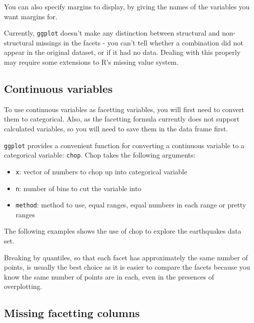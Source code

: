 You can also specify margins to display, by giving the names of the variables you want margins for.  


Currently, {\tt ggplot} doesn't make any distinction between structural and non-structural missings in the facets - you can't tell whether a combination did not appear in the original dataset, or if it had no data.  Dealing with this properly may require some extensions to R's missing value system.  

\subsection{Continuous variables}\label{sub:continuous_variables}

To use continuous variables as facetting variables, you will first need to convert them to categorical.  Also, as the facetting formula currently does not support calculated variables, so you will need to save them in the data frame first.

{\tt ggplot} provides a convenient function for converting a continuous variable to a categorical variable: {\tt chop}.  Chop takes the following arguments:

\begin{itemize}
	\item {\tt x}: vector of numbers to chop up into categorical variable
	\item {\tt n}: number of bins to cut the variable into
	\item {\tt method}: method to use, equal ranges, equal numbers in each range or pretty ranges
\end{itemize}

The following examples shows the use of chop to explore the earthquakes data set.


Breaking by quantiles, so that each facet has approximately the same number of points, is usually the best choice as it is easier to compare the facets because you know the same number of points are in each, even in the presences of overplotting.

\subsection{Missing facetting columns}\label{sub:missing_facetting_columsn}

